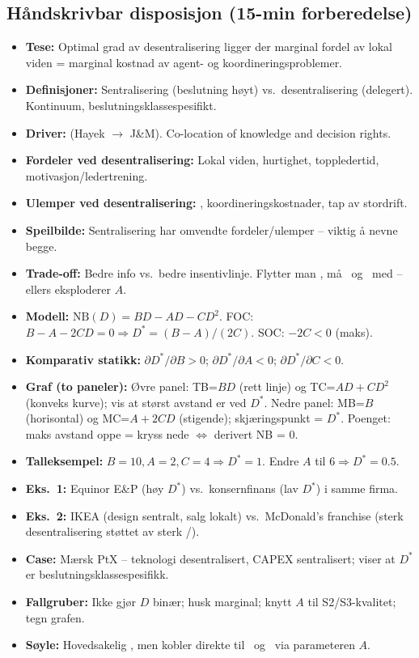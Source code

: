 \FloatBarrier
\subsection*{Håndskrivbar disposisjon (15-min forberedelse)}
\begin{itemize}\setlength{\itemsep}{2pt}
\item \textbf{Tese:} Optimal grad av desentralisering ligger der marginal fordel av lokal viden = marginal kostnad av agent- og koordineringsproblemer.
\item \textbf{Definisjoner:} Sentralisering (beslutning høyt) vs.\ desentralisering (delegert). Kontinuum, beslutningsklassespesifikt.
\item \textbf{Driver:}  (Hayek $\to$ J\&M). Co-location of knowledge and decision rights.
\item \textbf{Fordeler ved desentralisering:} Lokal viden, hurtighet, toppledertid, motivasjon/ledertrening.
\item \textbf{Ulemper ved desentralisering:} , koordineringskostnader, tap av stordrift.
\item \textbf{Speilbilde:} Sentralisering har omvendte fordeler/ulemper -- viktig å nevne begge.
\item \textbf{Trade-off:} Bedre info vs.\ bedre insentivlinje. Flytter man \SOne, må \STwo\ og \SThree\ med -- ellers eksploderer $A$.
\item \textbf{Modell:} $\mathrm{NB}(D) = BD - AD - CD^{2}$. FOC: $B - A - 2CD = 0 \Rightarrow D^{*} = (B-A)/(2C)$. SOC: $-2C < 0$ (maks).
\item \textbf{Komparativ statikk:} $\partial D^{*}/\partial B > 0$; $\partial D^{*}/\partial A < 0$; $\partial D^{*}/\partial C < 0$.
\item \textbf{Graf (to paneler):} Øvre panel: TB=$BD$ (rett linje) og TC=$AD+CD^{2}$ (konveks kurve); vis at størst avstand er ved $D^{*}$. Nedre panel: MB=$B$ (horisontal) og MC=$A+2CD$ (stigende); skjæringspunkt = $D^{*}$. Poenget: maks avstand oppe = kryss nede $\Leftrightarrow$ derivert NB = 0.
\item \textbf{Talleksempel:} $B=10, A=2, C=4 \Rightarrow D^{*} = 1$. Endre $A$ til $6 \Rightarrow D^{*} = 0.5$.
\item \textbf{Eks.\ 1:} Equinor E\&P (høy $D^{*}$) vs.\ konsernfinans (lav $D^{*}$) i samme firma.
\item \textbf{Eks.\ 2:} IKEA (design sentralt, salg lokalt) vs.\ McDonald's franchise (sterk desentralisering støttet av sterk \STwo/\SThree).
\item \textbf{Case:} Mærsk PtX -- teknologi desentralisert, CAPEX sentralisert; viser at $D^{*}$ er beslutningsklassespesifikk.
\item \textbf{Fallgruber:} Ikke gjør $D$ binær; husk marginal; knytt $A$ til S2/S3-kvalitet; tegn grafen.
\item \textbf{Søyle:} Hovedsakelig \SOne, men kobler direkte til \STwo\ og \SThree\ via parameteren $A$.
\end{itemize}
